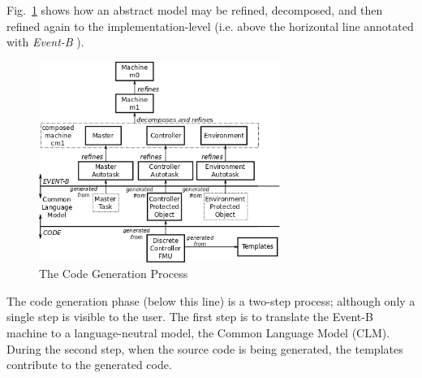 \documentclass{llncs}%
\begin{document}
Fig.~\ref{fig:CGProcess} shows how an abstract model may be refined, decomposed, and then refined again to the implementation-level (i.e. above the horizontal line annotated with \emph{Event-B} ).
%
\begin{figure}
\centering
\includegraphics[width=0.7\textwidth]{devel.png}
\caption{The Code Generation Process}
\label{fig:CGProcess}
\vspace*{-12pt}
\end{figure}
The code generation phase (below this line) is a two-step process; although only a single step is visible to the user. The first step is to translate the Event-B machine to a language-neutral model, the Common Language Model (CLM). During the second step, when the source code is being generated, the templates contribute to the generated code. 
\end{document}
